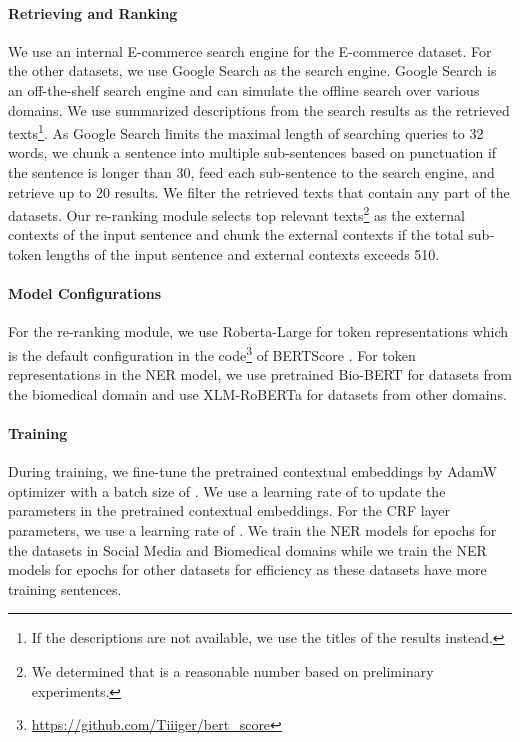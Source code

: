 \documentclass[11pt,a4paper]{article}
\begin{document}
\paragraph{Retrieving and Ranking} We use an internal E-commerce search engine for the E-commerce dataset. For the other datasets, we use Google Search as the search engine. Google Search is an off-the-shelf search engine and can simulate the offline search over various domains.
We use summarized descriptions from the search results as the retrieved texts\footnote{If the descriptions are not available, we use the titles of the results instead.}. As Google Search limits the maximal length of searching queries to 32 words, we chunk a sentence into multiple sub-sentences based on punctuation if the sentence is longer than 30, feed each sub-sentence to the search engine, and retrieve up to 20 results. We filter the retrieved texts that contain any part of the datasets. Our re-ranking module selects top  relevant texts\footnote{We determined that  is a reasonable number based on preliminary experiments.} as the external contexts of the input sentence and chunk the external contexts if the total sub-token lengths of the input sentence and external contexts exceeds 510.

\paragraph{Model Configurations}
For the re-ranking module, we use Roberta-Large \citep{liu2019roberta} for token representations which is the default configuration in the code\footnote{\url{https://github.com/Tiiiger/bert_score}} of BERTScore \citep{Zhang*2020BERTScore:}. For token representations in the NER model, we use pretrained Bio-BERT \citep{lee2020biobert} for datasets from the biomedical domain and use XLM-RoBERTa \citep{conneau-etal-2020-unsupervised} for datasets from other domains. 

\paragraph{Training} 
During training, we fine-tune the pretrained contextual embeddings by AdamW \citep{loshchilov2018decoupled} optimizer with a batch size of . We use a learning rate of  to update the parameters in the pretrained contextual embeddings. For the CRF layer parameters, we use a learning rate of . We train the NER models for  epochs for the datasets in Social Media and Biomedical domains while we train the NER models for  epochs for other datasets for efficiency as these datasets have more training sentences.
\end{document}
